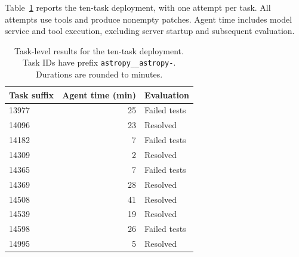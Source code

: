 Table~\ref{tab:swe-tasks} reports the ten-task deployment, with one attempt per task. All attempts use tools and produce nonempty patches. Agent time includes model service and tool execution, excluding server startup and subsequent evaluation.

\begin{table}[!htbp]
\caption{Task-level results for the ten-task \sys{} deployment. Task IDs have prefix \texttt{astropy\_\_astropy-}. Durations are rounded to minutes.}
\label{tab:swe-tasks}
\centering\small
\begin{tabular}{@{}lrl@{}}
\toprule
Task suffix & Agent time (min) & Evaluation \\
\midrule
13977 & 25 & Failed tests \\
14096 & 23 & Resolved \\
14182 & 7 & Failed tests \\
14309 & 2 & Resolved \\
14365 & 7 & Failed tests \\
14369 & 28 & Resolved \\
14508 & 41 & Resolved \\
14539 & 19 & Resolved \\
14598 & 26 & Failed tests \\
14995 & 5 & Resolved \\
\bottomrule
\end{tabular}
\end{table}
